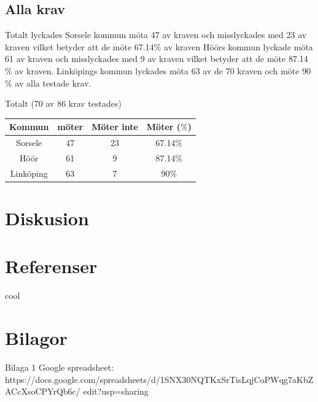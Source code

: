 \documentclass[11p]{article}
\begin{document}
    \subsection{Alla krav}
    Totalt lyckades Sorsele kommun möta 47 av kraven och misslyckades med 23 av kraven vilket betyder att de möte 67.14$\%$ av kraven
    Höörs kommun lyckade möta 61 av kraven och misslyckades med 9 av kraven vilket betyder att de möte 87.14$\%$ av kraven.
    Linköpings kommun lyckades möta 63 av de 70 kraven och möte 90$\%$ av alla testade krav.

    \begin{center}
    Totalt (70 av 86 krav testades)

    \begin{tabular}{ |c|c|c|c|}
        \hline
        Kommun & möter & Möter inte & Möter ($\%$) \\  \hline
        Sorsele & 47 & 23 & 67.14$\%$ \\ \hline
        Höör & 61 & 9 & 87.14$\%$ \\ \hline
        Linköping & 63 & 7 & 90$\%$ \\ \hline
    \end{tabular}
    \end{center}

    \section{Diskusion}

    \section{Referenser}

    \printbibliography

    cool

    \section{Bilagor}
    Bilaga 1
    Google spreadsheet:
    \\ https://docs.google.com/spreadsheets/d/1SNX30NQTKxSrTisLqjCoPWqg7aKbZACcXsoCPYrQb6c/
    edit?usp=sharing
\end{document}
